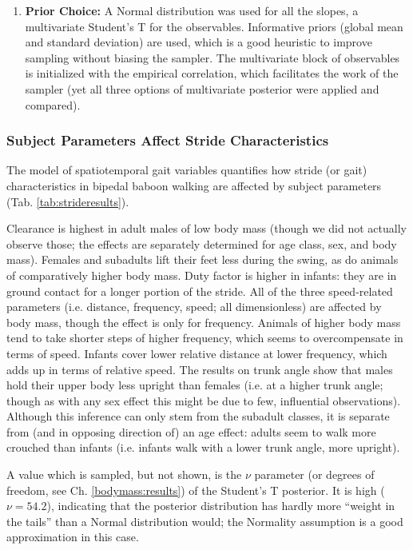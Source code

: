 \begin{enumerate}
\item \textbf{Prior Choice:}
\label{sec:orgffbfe48}
A Normal distribution was used for all the slopes, a multivariate Student's T for the observables.
Informative priors (global mean and standard deviation) are used, which is a good heuristic to improve sampling without biasing the sampler.
The multivariate block of observables is initialized with the empirical correlation, which facilitates the work of the sampler (yet all three options of multivariate posterior were applied and compared).
\end{enumerate}


\subsubsection{Subject Parameters Affect Stride Characteristics}
\label{sec:orge85b957}
The model of spatiotemporal gait variables quantifies how stride (or gait) characteristics in bipedal baboon walking are affected by subject parameters (Tab. \ref{tab:strideresults}).

Clearance is highest in adult males of low body mass (though we did not actually observe those; the effects are separately determined for age class, sex, and body mass).
Females and subadults lift their feet less during the swing, as do animals of comparatively higher body mass.
Duty factor is higher in infants: they are in ground contact for a longer portion of the stride.
All of the three speed-related parameters (i.e. distance, frequency, speed; all dimensionless) are affected by body mass, though the effect is  only for frequency.
Animals of higher body mass tend to take shorter steps of higher frequency, which seems to overcompensate in terms of speed.
Infants cover lower relative distance at lower frequency, which adds up in terms of relative speed.
The results on trunk angle show that males hold their upper body less upright than females (i.e. at a higher trunk angle; though as with any sex effect this might be due to few, influential observations).
Although this inference can only stem from the subadult classes, it is separate from (and in opposing direction of) an age effect: adults seem to walk more crouched than infants (i.e. infants walk with a lower trunk angle, more upright).

A value which is sampled, but not shown, is the \(\nu\) parameter (or degrees of freedom, see Ch. \ref{bodymass:results}) of the Student's T posterior.
It is high (\(\nu = 54.2\)), indicating that the posterior distribution has hardly more ``weight in the tails'' than a Normal distribution would; the Normality assumption is a good approximation in this case.


